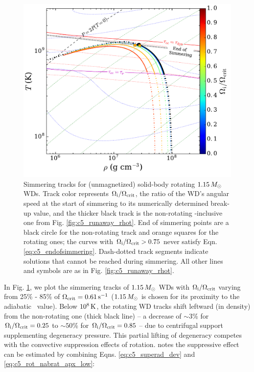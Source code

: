 \begin{figure}
\centering
\includegraphics[angle=0,width=0.8\columnwidth]{chapter5_zhu+16/figures/rot_stev_1pt15_rhot.pdf}
\caption{Simmering tracks for (unmagnetized) solid-body rotating $1.15\,\Msun$ WDs.  Track color represents $\Ominit/\Omcrit$, the ratio of the WD's angular speed at the start of simmering to its numerically determined break-up value, and the thicker black track is the non-rotating \dnabconv-inclusive one from Fig. \ref{fig:c5_runaway_rhot}.  End of simmering points are a black circle for the non-rotating track and orange squares for the rotating ones; the curves with $\Ominit/\Omcrit > 0.75$ never satisfy Eqn. \ref{eq:c5_endofsimmering}.  Dash-dotted track segments indicate solutions that cannot be reached during simmering.  All other lines and symbols are as in Fig. \ref{fig:c5_runaway_rhot}.}
\label{fig:c5_rot_stev_1pt15_rhot}
\end{figure}


In Fig. \ref{fig:c5_rot_stev_1pt15_rhot}, we plot the simmering tracks of $1.15\,\Msun$ WDs with $\Ominit/\Omcrit$ varying from 25\% - 85\% of $\Omcrit = 0.61\,\mrm{s}^{-1}$ ($1.15\,\Msun$ is chosen for its proximity to the adiabatic \Mcrit\ value).  Below $10^{8}\,\mathrm{K}$, the rotating WD tracks shift leftward (in density) from the non-rotating one (thick black line) -- a decrease of $\sim3$\% for $\Ominit/\Omcrit = 0.25$ to $\sim50$\% for $\Ominit/\Omcrit = 0.85$ -- due to centrifugal support supplementing degeneracy pressure.  This partial lifting of degeneracy competes with the convective suppression effects of rotation.  \citeal{stev79} notes the suppressive effect can be estimated by combining Eqns. \ref{eq:c5_superad_dev} and \ref{eq:c5_rot_nabrat_apx_low}:

